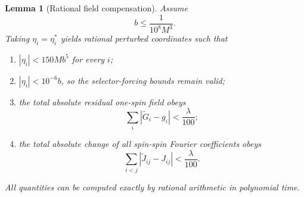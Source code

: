 \documentclass[12pt,a4paper]{article}
\newtheorem{lemma}[theorem]{Lemma}
\begin{document}
\begin{lemma}[Rational field compensation]\label{lem:field}
Assume
\begin{equation}\label{eq:b-choice-abstract}
 b\le\frac1{10^8M^3}.
\end{equation}
Taking $\eta_i=\eta_i^*$ yields rational perturbed coordinates such that
\begin{enumerate}[label=(\roman*)]
\item $|\eta_i|<150Mb^5$ for every $i$;
\item $|\eta_i|<10^{-6}b$, so the selector-forcing bounds remain valid;
\item the total absolute residual one-spin field obeys
\begin{equation}\label{eq:field-resid}
 \sum_i|\widetilde G_i-g_i|<\frac{\lambda}{100};
\end{equation}
\item the total absolute change of all spin-spin Fourier coefficients obeys
\begin{equation}\label{eq:J-pert}
 \sum_{i<j}|\widetilde J_{ij}-J_{ij}|<\frac{\lambda}{100}.
\end{equation}
\end{enumerate}
All quantities can be computed exactly by rational arithmetic in polynomial time.
\end{lemma}
\end{document}
